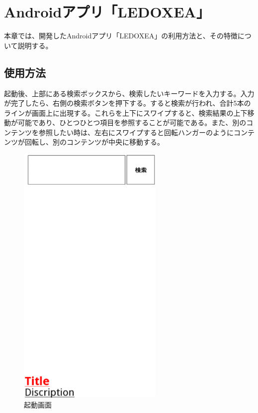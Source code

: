 \chapter{Androidアプリ「LEDOXEA」}
\label{chap:ledoxea}

本章では、開発したAndroidアプリ「LEDOXEA」の利用方法と、その特徴について説明する。

\section{使用方法}
起動後、上部にある検索ボックスから、検索したいキーワードを入力する。入力が完了したら、右側の検索ボタンを押下する。すると検索が行われ、合計5本のラインが画面上に出現する。これらを上下にスワイプすると、検索結果の上下移動が可能であり、ひとつひとつ項目を参照することが可能である。また、別のコンテンツを参照したい時は、左右にスワイプすると回転ハンガーのようにコンテンツが回転し、別のコンテンツが中央に移動する。
\begin{figure}[htbp]
\begin{center}
\includegraphics[width=7cm]{le01.eps}
\caption{起動画面}
\label{le01}
\end{center}
\end{figure}

